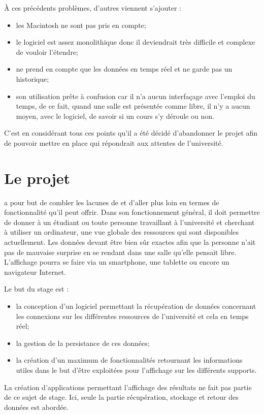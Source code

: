 \noindent \`A ces pr\'ec\'edents probl\`emes, d'autres viennent s'ajouter :

\begin{itemize}
	\item les Macintosh ne sont pas pris en compte;
	\item le logiciel est assez monolithique donc il deviendrait tr\`es difficile et complexe de vouloir l'\'etendre;
	\item {\Yuukou} ne prend en compte que les donn\'ees en temps r\'eel et ne garde pas un historique;
	\item son utilisation pr\^ete \`a confusion car il n'a aucun interfa\c{c}age avec l'emploi du temps, de ce fait, quand une salle est pr\'esent\'ee comme libre, il n'y a aucun moyen, avec le logiciel, de savoir si un cours s'y d\'eroule ou non.

\end{itemize}

\vspace{0.20cm}

C'est en consid\'erant tous ces points qu'il a \'et\'e d\'ecid\'e d'abandonner le projet \Yuukou{} afin de pouvoir mettre en place \YuukouII{} qui r\'epondrait aux attentes de l'universit\'e.

\section{Le projet \YuukouII}


\YuukouII{} a pour but de combler les lacunes de \Yuukou{} et d'aller plus loin en termes de fonctionnalit\'e qu'il peut offrir. 
Dans son fonctionnement g\'en\'eral, il doit permettre de donner \`a un \'etudiant ou toute personne travaillant \`a l'universit\'e et cherchant \`a utiliser un ordinateur, une vue globale des ressources qui sont disponibles actuellement.
Les donn\'ees devant \^etre bien s\^ur exactes afin que la personne n'ait pas de mauvaise surprise en se rendant dans une salle qu'elle pensait libre.
L'affichage pourra se faire via un smartphone, une tablette ou encore un navigateur Internet.

\noindent Le but du stage est : 

\begin{itemize}
	\item la conception d'un logiciel permettant la r\'ecup\'eration de donn\'ees concernant les connexions sur les diff\'erentes ressources de l'universit\'e et cela en temps r\'eel;
	\item la gestion de la persistance de ces donn\'ees;
	\item la cr\'eation d'un maximum de fonctionnalit\'es retournant les informations utiles dans le but d'\^etre exploit\'ees pour l'affichage sur les diff\'erents supports.

\end{itemize} 

\vspace{0.20cm}

La cr\'eation d'applications permettant l'affichage des r\'esultats ne fait pas partie de ce sujet de stage. 
Ici, seule la partie r\'ecup\'eration, stockage et retour des donn\'ees est abord\'ee.

\clearpage
